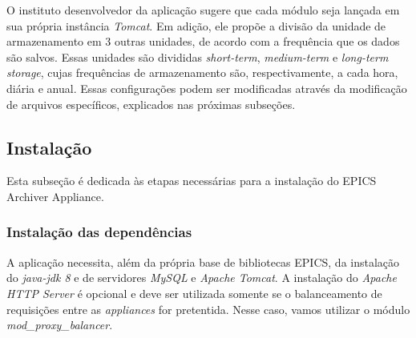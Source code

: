 \FloatBarrier

O instituto desenvolvedor da aplicação sugere que cada módulo seja lançada em
sua própria instância \textit{Tomcat}. Em adição, ele propõe a divisão da
unidade de armazenamento em 3 outras unidades, de acordo com a frequência que os
dados são salvos. Essas unidades são divididas \textit{short-term},
\textit{medium-term} e \textit{long-term storage}, cujas frequências de
armazenamento são, respectivamente, a cada hora, diária e anual. Essas
configurações podem ser modificadas através da modificação de arquivos
específicos, explicados nas próximas subseções.

\subsection {Instalação}

Esta subseção é dedicada às etapas necessárias para a instalação do EPICS
Archiver Appliance.

\subsubsection {Instalação das dependências}

A aplicação necessita, além da própria base de bibliotecas EPICS, da
instalação do \textit{java-jdk 8} e de servidores \textit{MySQL} e
\textit{Apache Tomcat}. A instalação do \textit{Apache HTTP Server} é opcional e
deve ser utilizada somente se o balanceamento de requisições entre as
\textit{appliances} for pretentida. Nesse caso, vamos utilizar o módulo
\textit{mod\_proxy\_balancer}.

